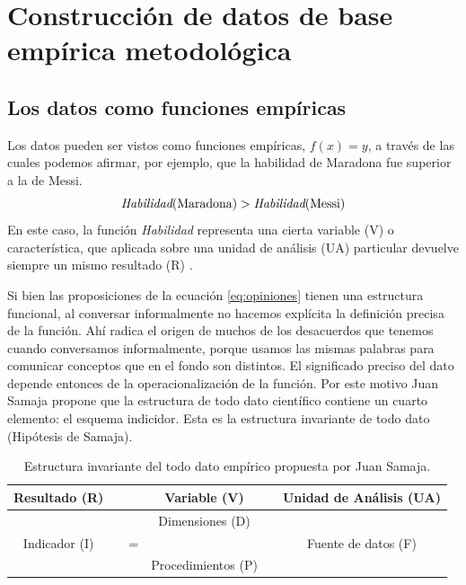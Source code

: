 \documentclass[a4paper,10pt]{book}
\theoremstyle{definition}
\begin{document}
\section{Construcción de datos de base empírica metodológica} \label{sec:base_empirica_metodo}

\subsection{Los datos como funciones empíricas}

Los datos pueden ser vistos como funciones empíricas, $f(x)=y$, a través de las cuales podemos afirmar, por ejemplo, que la habilidad de Maradona fue superior a la de Messi.
\begin{equation}\label{eq:opiniones}
 \emph{Habilidad}(\text{Maradona}) > \emph{Habilidad}(\text{Messi})
\end{equation}
En este caso, la función \emph{Habilidad} representa una cierta variable (V) o característica, que aplicada sobre una unidad de análisis (UA) particular devuelve siempre un mismo resultado (R) .


Si bien las proposiciones de la ecuación \ref{eq:opiniones} tienen una estructura funcional, al conversar informalmente no hacemos explícita la definición precisa de la función.
Ahí radica el origen de muchos de los desacuerdos que tenemos cuando conversamos informalmente, porque usamos las mismas palabras para comunicar conceptos que en el fondo son distintos.
El significado preciso del dato depende entonces de la operacionalización de la función.
Por este motivo Juan Samaja propone que la estructura de todo dato científico contiene un cuarto elemento: el esquema indicidor.
Esta es la estructura invariante de todo dato (Hipótesis de Samaja).

\begin{table}[ht!]
\centering
\begin{tabular}{clcccc}
Resultado (R) & \multicolumn{1}{r|}{} &  & Variable (V) &  &  \multicolumn{1}{|c}{Unidad de Análisis (UA)} \\ \hline
   &  \multicolumn{1}{r|}{}    &  & Dimensiones (D) &  & \multicolumn{1}{|r}{} \\
                 Indicador (I)  &   & =  &  &  &  Fuente de datos (F) \\
 & \multicolumn{1}{r|}{} &  & Procedimientos (P) &        &    \multicolumn{1}{|r}{}  
\end{tabular}
\caption{Estructura invariante del todo dato empírico propuesta por Juan Samaja.}
\label{tab:matriz_datos}
\end{table}
\end{document}
